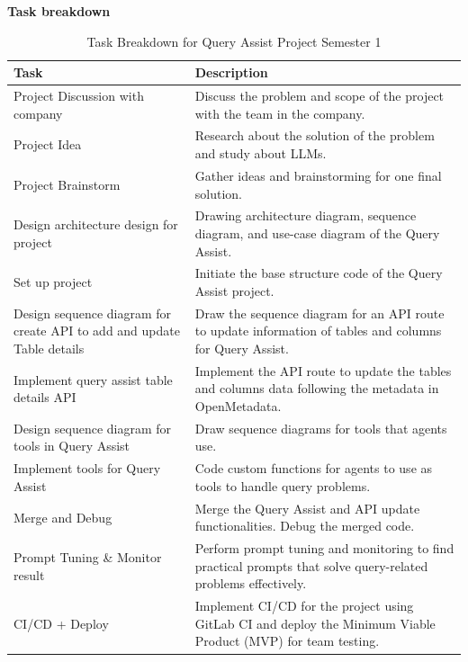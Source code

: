     \textbf{Task breakdown}
    \begin{table}[H]
        \centering
        \caption{Task Breakdown for Query Assist Project Semester 1}
        \label{tbl:task-breakdown}
        \begin{tabular}{|p{4cm}|p{10cm}|}
            \hline
            \textbf{Task} & \textbf{Description} \\
            \hline
            Project Discussion with company & Discuss the problem and scope of the project with the team in the company. \\
            \hline
            Project Idea & Research about the solution of the problem and study about LLMs. \\
            \hline
            Project Brainstorm & Gather ideas and brainstorming for one final solution. \\
            \hline
            Design architecture design for project & Drawing architecture diagram, sequence diagram, and use-case diagram of the Query Assist. \\
            \hline
            Set up project & Initiate the base structure code of the Query Assist project. \\
            \hline
            Design sequence diagram for create API to add and update Table details & Draw the sequence diagram for an API route to update information of tables and columns for Query Assist. \\
            \hline
            Implement query assist table details API & Implement the API route to update the tables and columns data following the metadata in OpenMetadata. \\
            \hline
            Design sequence diagram for tools in Query Assist & Draw sequence diagrams for tools that agents use. \\
            \hline
            Implement tools for Query Assist & Code custom functions for agents to use as tools to handle query problems. \\
            \hline
            Merge and Debug & Merge the Query Assist and API update functionalities. Debug the merged code. \\
            \hline
            Prompt Tuning \& Monitor result & Perform prompt tuning and monitoring to find practical prompts that solve query-related problems effectively. \\
            \hline
            CI/CD + Deploy & Implement CI/CD for the project using GitLab CI and deploy the Minimum Viable Product (MVP) for team testing. \\

\end{tabular}
\end{table}
